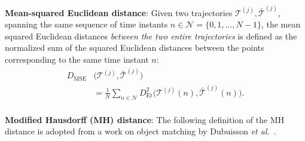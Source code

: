 \documentclass[a4paper, 10pt, conference]{ieeeconf}      %
\begin{document}
\textbf{Mean-squared Euclidean distance}: Given two trajectories $\mathcal T^{(j)}, \bar{\mathcal T}^{(j)}$, spanning the same sequence of time instants $n \in \mathcal N = \{0,1,\dots,N\!\!-\!\!1\}$, the mean squared Euclidean distances \textit{between the two entire trajectories} is defined as the normalized sum of the squared Euclidean distances between the points corresponding to the same time instant $n$:
\begin{equation} \label{eq:meanSquaredEuclideanDisplacement}
   \begin{split}
     D_{{\mathrm{MSE}}}&\Big(\mathcal T^{(j)},\bar{\mathcal T}^{(j)}\Big) \\
      &= \frac{1}{N} \sum\limits_{n \in \mathcal N}D_{{\mathrm{Et}}}^2\Big(\mathcal T^{(j)}(n), \bar{\mathcal T}^{(j)}(n)\Big). \\
   \end{split}
\end{equation}


\textbf{Modified Hausdorff (MH) distance}: The following definition of the \gls{MH} distance is adopted from a work on object matching by Dubuisson \textit{et al.}~\cite{dubuisson_modified_1994}.
\end{document}
